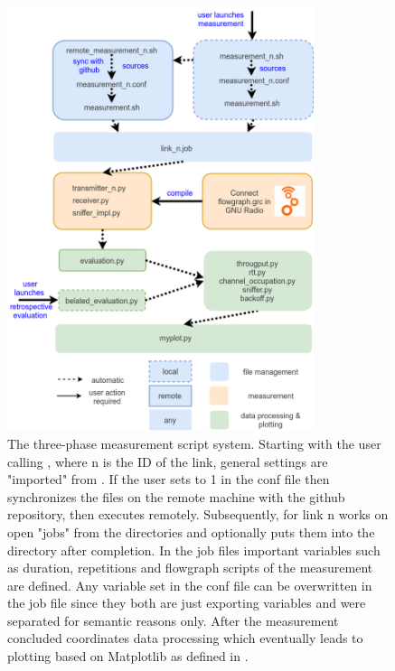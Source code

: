 \begin{figure}[tb]
	\label{fig:script-system}
	\begin{center}
		\includegraphics[width=0.8\textwidth]{pictures/script_system}
	\end{center}
	\caption{The three-phase measurement script system. Starting with the user calling , where n is the ID of the link, general settings are "imported" from . If the user sets  to 1 in the conf file then  synchronizes the files on the remote machine with the github repository, then executes  remotely. Subsequently,  for link n works on open "jobs" from the  directories and optionally puts them into the  directory after completion. In the job files important variables such as duration, repetitions and flowgraph scripts of the measurement are defined. Any variable set in the conf file can be overwritten in the job file since they both are just exporting variables and were separated for semantic reasons only. After the measurement concluded  coordinates data processing which eventually leads to plotting based on Matplotlib as defined in .}
\end{figure}